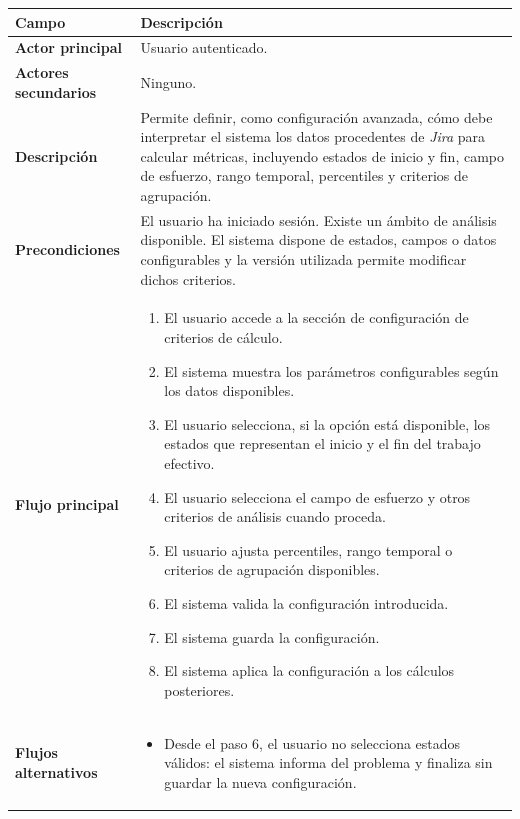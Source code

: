 {\renewcommand{\arraystretch}{1.25}\footnotesize
\begin{longtable}{p{3.2cm}p{10.2cm}}
\toprule
\textbf{Campo} & \textbf{Descripción} \\
\midrule
\textbf{Actor principal} & Usuario autenticado. \\
\textbf{Actores secundarios} & Ninguno. \\
\textbf{Descripción} & Permite definir, como configuración avanzada, cómo debe interpretar el sistema los datos procedentes de \textit{Jira} para calcular métricas, incluyendo estados de inicio y fin, campo de esfuerzo, rango temporal, percentiles y criterios de agrupación. \\
\textbf{Precondiciones} & El usuario ha iniciado sesión. Existe un ámbito de análisis disponible. El sistema dispone de estados, campos o datos configurables y la versión utilizada permite modificar dichos criterios. \\
\textbf{Flujo principal} & \begin{minipage}[t]{10.2cm}\begin{enumerate}[noitemsep,leftmargin=*]
    \item El usuario accede a la sección de configuración de criterios de cálculo.
    \item El sistema muestra los parámetros configurables según los datos disponibles.
    \item El usuario selecciona, si la opción está disponible, los estados que representan el inicio y el fin del trabajo efectivo.
    \item El usuario selecciona el campo de esfuerzo y otros criterios de análisis cuando proceda.
    \item El usuario ajusta percentiles, rango temporal o criterios de agrupación disponibles.
    \item El sistema valida la configuración introducida.
    \item El sistema guarda la configuración.
    \item El sistema aplica la configuración a los cálculos posteriores.
\end{enumerate}\end{minipage} \\
\textbf{Flujos alternativos} & \begin{minipage}[t]{10.2cm}\begin{itemize}[noitemsep,leftmargin=*]
    \item Desde el paso 6, el usuario no selecciona estados válidos: el sistema informa del problema y finaliza sin guardar la nueva configuración.

\end{itemize}
\end{minipage}
\end{longtable}}
